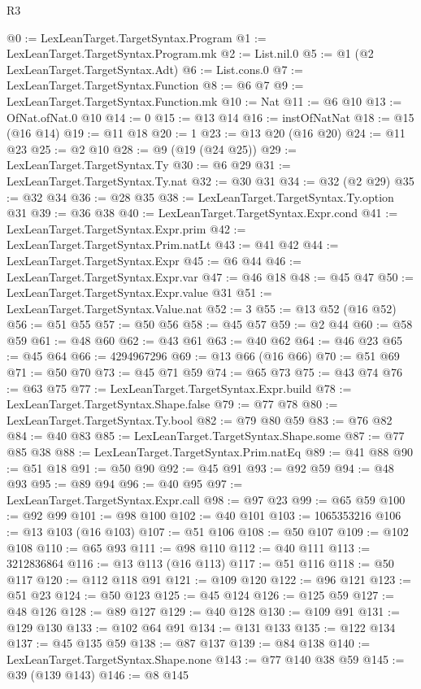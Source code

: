 \begin{lexlean}{R3}
\begin{coremodule}
@0 := LexLeanTarget.TargetSyntax.Program
@1 := LexLeanTarget.TargetSyntax.Program.mk
@2 := List.nil.{0}
@5 := @1 (@2 LexLeanTarget.TargetSyntax.Adt)
@6 := List.cons.{0}
@7 := LexLeanTarget.TargetSyntax.Function
@8 := @6 @7
@9 := LexLeanTarget.TargetSyntax.Function.mk
@10 := Nat
@11 := @6 @10
@13 := OfNat.ofNat.{0} @10
@14 := 0
@15 := @13 @14
@16 := instOfNatNat
@18 := @15 (@16 @14)
@19 := @11 @18
@20 := 1
@23 := @13 @20 (@16 @20)
@24 := @11 @23
@25 := @2 @10
@28 := @9 (@19 (@24 @25))
@29 := LexLeanTarget.TargetSyntax.Ty
@30 := @6 @29
@31 := LexLeanTarget.TargetSyntax.Ty.nat
@32 := @30 @31
@34 := @32 (@2 @29)
@35 := @32 @34
@36 := @28 @35
@38 := LexLeanTarget.TargetSyntax.Ty.option @31
@39 := @36 @38
@40 := LexLeanTarget.TargetSyntax.Expr.cond
@41 := LexLeanTarget.TargetSyntax.Expr.prim
@42 := LexLeanTarget.TargetSyntax.Prim.natLt
@43 := @41 @42
@44 := LexLeanTarget.TargetSyntax.Expr
@45 := @6 @44
@46 := LexLeanTarget.TargetSyntax.Expr.var
@47 := @46 @18
@48 := @45 @47
@50 := LexLeanTarget.TargetSyntax.Expr.value @31
@51 := LexLeanTarget.TargetSyntax.Value.nat
@52 := 3
@55 := @13 @52 (@16 @52)
@56 := @51 @55
@57 := @50 @56
@58 := @45 @57
@59 := @2 @44
@60 := @58 @59
@61 := @48 @60
@62 := @43 @61
@63 := @40 @62
@64 := @46 @23
@65 := @45 @64
@66 := 4294967296
@69 := @13 @66 (@16 @66)
@70 := @51 @69
@71 := @50 @70
@73 := @45 @71 @59
@74 := @65 @73
@75 := @43 @74
@76 := @63 @75
@77 := LexLeanTarget.TargetSyntax.Expr.build
@78 := LexLeanTarget.TargetSyntax.Shape.false
@79 := @77 @78
@80 := LexLeanTarget.TargetSyntax.Ty.bool
@82 := @79 @80 @59
@83 := @76 @82
@84 := @40 @83
@85 := LexLeanTarget.TargetSyntax.Shape.some
@87 := @77 @85 @38
@88 := LexLeanTarget.TargetSyntax.Prim.natEq
@89 := @41 @88
@90 := @51 @18
@91 := @50 @90
@92 := @45 @91
@93 := @92 @59
@94 := @48 @93
@95 := @89 @94
@96 := @40 @95
@97 := LexLeanTarget.TargetSyntax.Expr.call
@98 := @97 @23
@99 := @65 @59
@100 := @92 @99
@101 := @98 @100
@102 := @40 @101
@103 := 1065353216
@106 := @13 @103 (@16 @103)
@107 := @51 @106
@108 := @50 @107
@109 := @102 @108
@110 := @65 @93
@111 := @98 @110
@112 := @40 @111
@113 := 3212836864
@116 := @13 @113 (@16 @113)
@117 := @51 @116
@118 := @50 @117
@120 := @112 @118 @91
@121 := @109 @120
@122 := @96 @121
@123 := @51 @23
@124 := @50 @123
@125 := @45 @124
@126 := @125 @59
@127 := @48 @126
@128 := @89 @127
@129 := @40 @128
@130 := @109 @91
@131 := @129 @130
@133 := @102 @64 @91
@134 := @131 @133
@135 := @122 @134
@137 := @45 @135 @59
@138 := @87 @137
@139 := @84 @138
@140 := LexLeanTarget.TargetSyntax.Shape.none
@143 := @77 @140 @38 @59
@145 := @39 (@139 @143)
@146 := @8 @145

\end{coremodule}
\end{lexlean}
